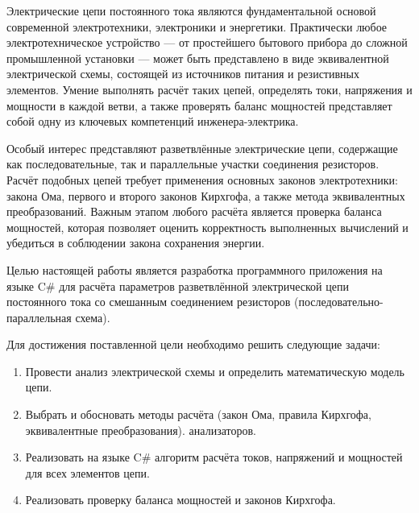 Электрические цепи постоянного тока являются фундаментальной основой современной электротехники, электроники и энергетики. Практически любое электротехническое устройство — от простейшего бытового прибора до сложной промышленной установки — может быть представлено в виде эквивалентной электрической схемы, состоящей из источников питания и резистивных элементов. Умение выполнять расчёт таких цепей, определять токи, напряжения и мощности в каждой ветви, а также проверять баланс мощностей представляет собой одну из ключевых компетенций инженера-электрика.

Особый интерес представляют разветвлённые электрические цепи, содержащие как последовательные, так и параллельные участки соединения резисторов. Расчёт подобных цепей требует применения основных законов электротехники: закона Ома, первого и второго законов Кирхгофа, а также метода эквивалентных преобразований. Важным этапом любого расчёта является проверка баланса мощностей, которая позволяет оценить корректность выполненных вычислений и убедиться в соблюдении закона сохранения энергии.

Целью настоящей работы является разработка программного приложения на языке C\# для расчёта параметров разветвлённой электрической цепи постоянного тока со смешанным соединением резисторов (последовательно-параллельная схема).

Для достижения поставленной цели необходимо решить следующие задачи:
\begin{enumerate}
    \item Провести анализ электрической схемы и определить математическую модель цепи.
    \item Выбрать и обосновать методы расчёта (закон Ома, правила Кирхгофа, эквивалентные преобразования). 
    анализаторов.
    \item Реализовать на языке C\# алгоритм расчёта токов, напряжений и мощностей для всех элементов цепи.
    \item Реализовать проверку баланса мощностей и законов Кирхгофа.
\end{enumerate}